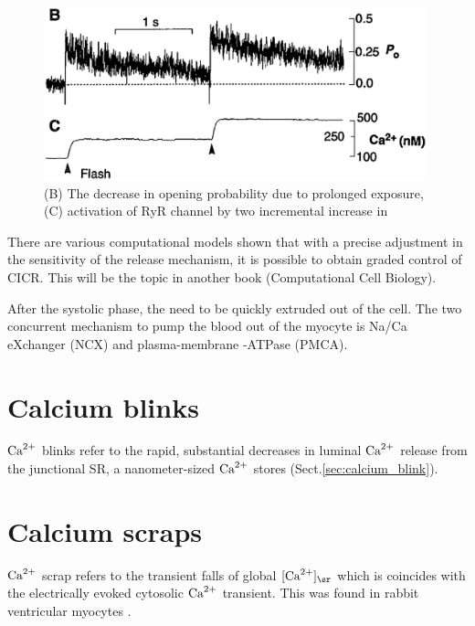 \begin{figure}[hbt]
  \centerline{\includegraphics[height=5cm]{./images/RyR_response.eps}}
  \caption{(B) The decrease in opening probability due to prolonged
     exposure,(C) activation of RyR channel by two incremental
    increase in }
  \label{fig:RyR_response}
\end{figure}

There are various computational models shown that with a precise
adjustment in the  sensitivity of the  release
mechanism, it is possible to obtain graded control of CICR. This will
be the topic in another book (Computational Cell Biology).

After the systolic phase, the  need to be quickly extruded
out of the cell. The two concurrent mechanism to pump the blood out of
the myocyte is Na/Ca eXchanger (NCX) and plasma-membrane
-ATPase (PMCA). 


\section{Calcium blinks}

${\text{Ca}^{2+}}$ blinks refer to the rapid, substantial decreases in luminal
${\text{Ca}^{2+}}$ release from the junctional SR, a nanometer-sized ${\text{Ca}^{2+}}$ stores
(Sect.\ref{sec:calcium_blink}).

\section{Calcium scraps}

${\text{Ca}^{2+}}$ scrap refers to the transient falls of global $[\Ca]_\sr$ which is
coincides with the electrically evoked cytosolic ${\text{Ca}^{2+}}$ transient. This was found
in rabbit ventricular myocytes \citep{shannon2003cs}. 

